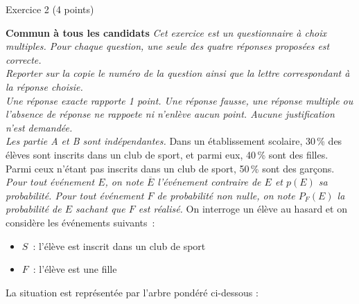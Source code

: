 
\begin{h2}Exercice 2 (4 points)\end{h2}
\textbf{Commun à  tous les candidats}
\medbreak
\emph{Cet exercice est un questionnaire à choix multiples. Pour chaque question, une seule des quatre réponses proposées est correcte.\\
     Reporter sur la copie le numéro de la question ainsi que la lettre correspondant à la réponse choisie.\\
     Une réponse exacte rapporte 1 point. Une réponse fausse, une réponse multiple ou l'absence de réponse ne rappoete ni n'enlève aucun point. Aucune justification n'est demandée.\\
Les partie \emph{A} et \emph{B} sont indépendantes.}
Dans un établissement scolaire, 30\,\% des élèves sont inscrits dans un club de sport, et parmi eux, 40\,\% sont des filles. Parmi ceux n'étant pas inscrits dans un club de sport, 50\,\% sont des garçons.
\smallbreak
\emph{Pour tout événement $E$, on note $\overline{E}$ l'événement contraire de $E$ et $p(E)$ sa probabilité. Pour tout événement $F$ de probabilité non nulle, on note $P_F(E)$ la probabilité de $E$ sachant que $F$ est réalisé.}
\medbreak
On interroge un élève au hasard et on considère les événements suivants~:
\begin{itemize}
     \item $S$~: \og l'élève est inscrit dans un club de sport \fg{}
     \item $F$~: \og l'élève est une fille \fg{}
\end{itemize}
     La situation est représentée par l'arbre pondéré ci-dessous :

